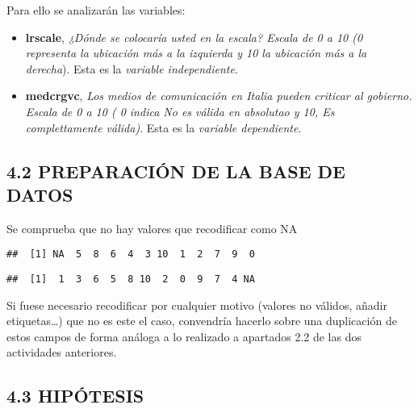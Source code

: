 \documentclass[
  12 pt,
  a4paper,
]{article}
\newenvironment{Shaded}{\begin{snugshade}}{\end{snugshade}}
\newcommand{\FunctionTok}[1]{\textcolor[rgb]{0.13,0.29,0.53}{\textbf{#1}}}
\newcommand{\NormalTok}[1]{#1}
\newcommand{\SpecialCharTok}[1]{\textcolor[rgb]{0.81,0.36,0.00}{\textbf{#1}}}
\begin{document}
Para ello se analizarán las variables:

\begin{itemize}
\item
  \textbf{lrscale}, \emph{¿Dónde se colocaría usted en la escala? Escala
  de 0 a 10 (0 representa la ubicación más a la izquierda y 10 la
  ubicación más a la derecha}). Esta es la \emph{variable
  independiente}.
\item
  \textbf{medcrgvc}, \emph{Los medios de comunicación en Italia pueden
  criticar al gobierno. Escala de 0 a 10 ( 0 indica No es válida en
  absolutao y 10, Es complettamente válida)}. Esta es la \emph{variable
  dependiente}.
\end{itemize}

\subsection{4.2 PREPARACIÓN DE LA BASE DE
DATOS}\label{preparaciuxf3n-de-la-base-de-datos-1}

Se comprueba que no hay valores que recodificar como NA

\begin{Shaded}
\end{Shaded}

\begin{verbatim}
##  [1] NA  5  8  6  4  3 10  1  2  7  9  0
\end{verbatim}

\begin{Shaded}
\end{Shaded}

\begin{verbatim}
##  [1]  1  3  6  5  8 10  2  0  9  7  4 NA
\end{verbatim}

Si fuese necesario recodificar por cualquier motivo (valores no válidos,
añadir etiquetas\ldots) que no es este el caso, convendría hacerlo sobre
una duplicación de estos campos de forma análoga a lo realizado a
apartados 2.2 de las dos actividades anteriores.

\subsection{4.3 HIPÓTESIS}\label{hipuxf3tesis-2}
\end{document}
